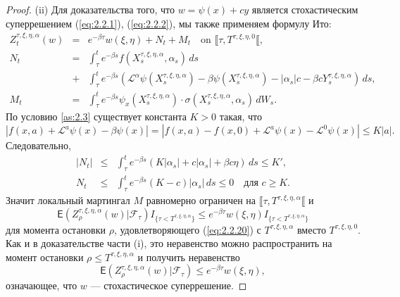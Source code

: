 \begin{proof}
(ii) Для доказательства того, что $w=\psi(x)+cy$ является стохастическим суперрешением (\ref{eq:2.2.1}), (\ref{eq:2.2.2}), мы также применяем формулу Ито:
\begin{eqnarray*}
Z^{\tau,\xi,\eta,\alpha}_t(w) &=& e^{-\beta \tau}w(\xi,\eta)+N_t+M_t \quad \textrm{on } \llbracket\tau,T^{\tau,\xi,\eta,0}\llbracket,\\
N_t &=&\int^t_\tau e^{-\beta s} f(X^{\tau,\xi,\eta,\alpha}_s,\alpha_s)\,ds\\
&+&\int^t_\tau e^{-\beta s}\left(\mathcal L^\alpha \psi(X^{\tau,\xi,\eta,\alpha}_s) - \beta \psi(X^{\tau,\xi,\eta,\alpha}_s) -|\alpha_s|c - \beta c Y^{\tau,\xi,\eta,\alpha}_s\right)\,ds, \\
M_t &=&\int^t_\tau e^{-\beta s} \psi_x(X^{\tau,\xi,\eta,\alpha}_s) \cdot \sigma(X^{\tau,\xi,\eta,\alpha}_s,\alpha_s) \, dW_s.
\end{eqnarray*}
По условию \ref{as:2.3} существует константа $K>0$ такая, что
$$|f(x,a)+\mathcal L^a\psi(x)-\beta\psi(x)| =|f(x,a)-f(x,0)+\mathcal L^a\psi(x)-\mathcal L^0\psi(x)|\le K|a|.$$
Следовательно,
\begin{eqnarray*}
 |N_t| &\le &\int^t_\tau e^{-\beta s} (K|\alpha_s|+c|\alpha_s|+\beta c \eta)\,ds\le K',\\
  N_t  &\le &\int^t_\tau e^{-\beta s} (K-c)|\alpha_s|\,ds\le 0\quad \textrm{для } c\ge K.
\end{eqnarray*}
Значит локальный мартингал $M$ равномерно ограничен на $\llbracket\tau,T^{\tau,\xi,\eta,\alpha}\llbracket$ и
$$ \mathsf E(Z^{\tau,\xi,\eta,\alpha}_\rho(w)|\mathscr F_\tau)I_{\{\tau<T^{\tau,\xi,\eta,\alpha}\}}\le e^{-\beta \tau}w(\xi,\eta)I_{\{\tau<T^{\tau,\xi,\eta,\alpha}\}}$$
для момента остановки $\rho$, удовлетворяющего (\ref{eq:2.2.20}) с $T^{\tau,\xi,\eta,\alpha}$ вместо $T^{\tau,\xi,\eta,0}$. Как и в доказательстве части (i), это неравенство можно распространить на момент остановки $\rho\le T^{\tau,\xi,\eta,\alpha}$ и получить неравенство
$$\mathsf E(Z^{\tau,\xi,\eta,\alpha}_\rho(w)|\mathscr F_\tau)\le e^{-\beta \tau}w(\xi,\eta),$$
означающее, что $w$ --- стохастическое суперрешение.


\end{proof}
